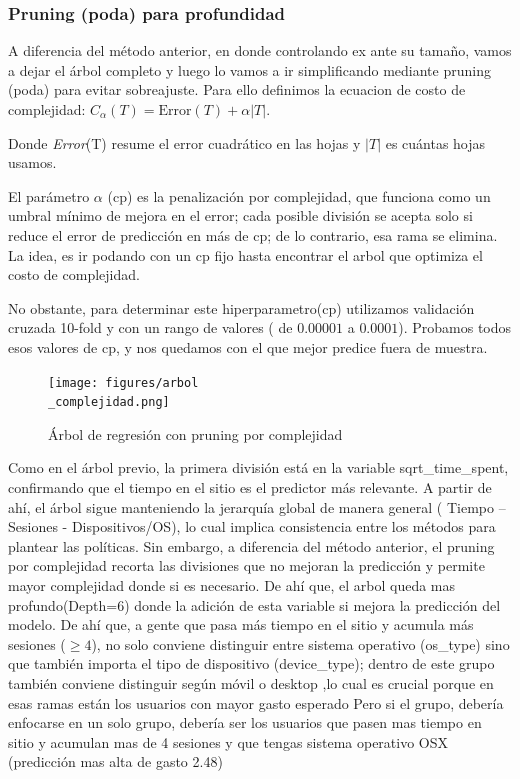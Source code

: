 \documentclass[conference]{IEEEtran}
\begin{document}
  \subsubsection{Pruning (poda) para profundidad}

  A diferencia del método anterior, en donde controlando ex ante su tamaño, vamos a dejar el árbol completo y luego lo vamos a ir simplificando mediante pruning (poda) para evitar sobreajuste. Para ello definimos la ecuacion de costo de complejidad:
 $C_{\alpha}(T) = \text{Error}(T) + \alpha |T|$.

Donde \textit{Error}(T) resume el error cuadrático en las hojas y 
$|T|$ es cuántas hojas usamos.

El parámetro $\alpha$ (cp) es la penalización por complejidad, que funciona como un umbral mínimo de mejora en el error; cada posible división se acepta solo si reduce el error de predicción en más de cp; de lo contrario, esa rama se elimina. La idea, es ir podando con un cp fijo hasta encontrar el arbol que optimiza el costo de complejidad.

No obstante, para determinar este hiperparametro(cp) utilizamos validación cruzada 10-fold y con un rango de valores ( de $0.00001$ a $0.0001$). Probamos todos esos valores de cp, y nos quedamos con el que mejor predice fuera de muestra.

\begin{figure}[h]
    \centering
    \texttt{[image: figures/arbol\\\_complejidad.png]}
    \caption{Árbol de regresión con pruning por complejidad}
    \label{fig:arbol_complejidad}

\end{figure}


Como en el árbol previo, la primera división está en la variable sqrt\_time\_spent, confirmando que el tiempo en el sitio es el predictor más relevante. A partir de ahí, el árbol sigue manteniendo la jerarquía global de manera general ( Tiempo – Sesiones - Dispositivos/OS), lo cual implica consistencia entre los métodos para plantear las  políticas. Sin embargo, a diferencia del método anterior, el pruning por complejidad recorta las divisiones que no mejoran la predicción y permite mayor complejidad donde si es necesario. De ahí que, el arbol queda mas profundo(Depth=6) donde la adición de esta variable si mejora la predicción del modelo. De ahí que, a gente que pasa más tiempo en el sitio y acumula más sesiones ($\geq 4$), no solo conviene distinguir entre sistema operativo (os\_type) sino que también importa el tipo de dispositivo (device\_type); dentro de este grupo también conviene distinguir según móvil o desktop ,lo cual es crucial porque en esas ramas están los usuarios con mayor gasto esperado Pero si el grupo, debería enfocarse en un solo grupo, debería ser los usuarios que pasen mas tiempo en sitio y  acumulan mas de 4 sesiones y que tengas sistema operativo OSX (predicción mas alta de gasto 2.48)
\end{document}

